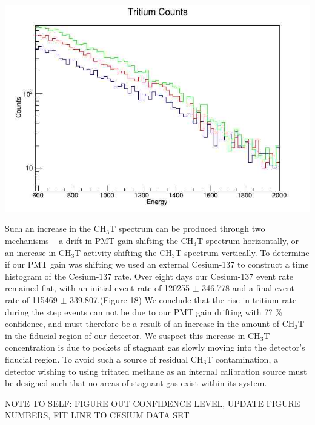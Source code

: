 \documentclass[a4paper,12pt]{article}
\begin{document}
\begin{center}
\includegraphics[scale=0.5]{Steps_Overlay.jpg}
\end{center}

Such an increase in the CH$_3$T spectrum can be produced through two mechanisms -- a drift in PMT gain shifting the CH$_3$T spectrum horizontally, or an increase in CH$_3$T activity shifting the CH$_3$T spectrum vertically.  To determine if our PMT gain was shifting we used an external Cesium-137 to construct a time histogram of the Cesium-137 rate.  Over eight days our Cesium-137 event rate remained flat, with an initial event rate of 120255 $ \pm $ 346.778 and a final event rate of 115469 $\pm$ 339.807.(Figure 18) We conclude that the rise in tritium rate during the step events can not be due to our PMT gain drifting with ?? \% confidence, and must therefore be a result of an increase in the amount of CH$_3$T in the fiducial region of our detector.  We suspect this increase in CH$_3$T concentration is due to pockets of stagnant gas slowly moving into the detector's fiducial region.  To avoid such a source of residual CH$_3$T contamination, a detector wishing to using tritated methane as an internal calibration source must be designed such that no areas of stagnant gas exist within its system.

NOTE TO SELF: FIGURE OUT CONFIDENCE LEVEL, UPDATE FIGURE NUMBERS, FIT LINE TO CESIUM DATA SET
\end{document}
